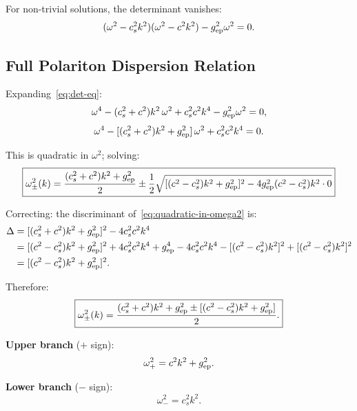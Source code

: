 \documentclass[aps,prd,twocolumn,superscriptaddress]{revtex4-2}
\begin{document}
For non-trivial solutions, the determinant vanishes:
\begin{equation}
(\omega^2 - c_s^2 k^2)(\omega^2 - c^2 k^2) - g_{\rm ep}^2 \omega^2 = 0.
\label{eq:det-eq}
\end{equation}

\subsection{Full Polariton Dispersion Relation}

Expanding~\eqref{eq:det-eq}:
\begin{equation}
\omega^4 - (c_s^2 + c^2)k^2\,\omega^2 + c_s^2 c^2 k^4 - g_{\rm ep}^2\omega^2 = 0,
\label{eq:quartic}
\end{equation}
\begin{equation}
\omega^4 - [(c_s^2+c^2)k^2 + g_{\rm ep}^2]\,\omega^2 + c_s^2 c^2 k^4 = 0.
\label{eq:quadratic-in-omega2}
\end{equation}

This is quadratic in $\omega^2$; solving:
\begin{equation}
\boxed{
\omega_{\pm}^2(k) = \frac{(c_s^2+c^2)k^2 + g_{\rm ep}^2}{2}
\pm \frac{1}{2}\sqrt{[(c^2-c_s^2)k^2 + g_{\rm ep}^2]^2
- 4 g_{\rm ep}^2(c^2-c_s^2)k^2\cdot 0}
}
\label{eq:dispersion-wrong}
\end{equation}

Correcting: the discriminant of~\eqref{eq:quadratic-in-omega2} is:
\begin{align}
\Delta &= [(c_s^2+c^2)k^2+g_{\rm ep}^2]^2 - 4c_s^2 c^2 k^4 \nonumber\\
&= [(c^2-c_s^2)k^2+g_{\rm ep}^2]^2
  + 4c_s^2 c^2 k^4
  + g_{\rm ep}^4
  - 4c_s^2 c^2 k^4
  - [(c^2-c_s^2)k^2]^2 + [(c^2-c_s^2)k^2]^2 \nonumber\\
&= [(c^2-c_s^2)k^2+g_{\rm ep}^2]^2.
\label{eq:discriminant}
\end{align}

Therefore:
\begin{equation}
\boxed{
\omega_{\pm}^2(k) = \frac{(c_s^2+c^2)k^2+g_{\rm ep}^2 \pm [(c^2-c_s^2)k^2+g_{\rm ep}^2]}{2}.
}
\label{eq:dispersion}
\end{equation}

\textbf{Upper branch} ($+$ sign):
\begin{equation}
\omega_+^2 = c^2 k^2 + g_{\rm ep}^2.
\label{eq:upper-branch}
\end{equation}

\textbf{Lower branch} ($-$ sign):
\begin{equation}
\omega_-^2 = c_s^2 k^2.
\label{eq:lower-branch}
\end{equation}
\end{document}

